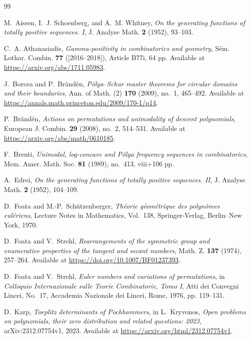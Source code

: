 \documentclass[a4paper,11pt,reqno]{amsart}
\numberwithin{equation}{section}
\theoremstyle{remark}
\begin{document}
\begin{thebibliography}{99}

M.~Aissen, I.~J. Schoenberg, and A.~M. Whitney,
\emph{On the generating functions of totally positive sequences. I},
J. Analyse Math. \textbf{2} (1952), 93--103.

C.~A. Athanasiadis,
\emph{Gamma-positivity in combinatorics and geometry},
S\'em. Lothar. Combin. \textbf{77} ([2016--2018]), Article B77i, 64 pp.
Available at \url{https://arxiv.org/abs/1711.05983}.

J.~Borcea and P.~Br\"and\'en,
\emph{P\'olya--Schur master theorems for circular domains and their boundaries},
Ann. of Math. (2) \textbf{170} (2009), no.~1, 465--492.
Available at \url{https://annals.math.princeton.edu/2009/170-1/p14}.

P.~Br\"and\'en,
\emph{Actions on permutations and unimodality of descent polynomials},
European J. Combin. \textbf{29} (2008), no.~2, 514--531.
Available at \url{https://arxiv.org/abs/math/0610185}.

F.~Brenti,
\emph{Unimodal, log-concave and P\'olya frequency sequences in combinatorics},
Mem. Amer. Math. Soc. \textbf{81} (1989), no.~413, viii+106 pp.

A.~Edrei,
\emph{On the generating functions of totally positive sequences. II},
J. Analyse Math. \textbf{2} (1952), 104--109.

D.~Foata and M.-P.~Sch\"utzenberger,
\emph{Th\'eorie g\'eom\'etrique des polyn\^omes eul\'eriens},
Lecture Notes in Mathematics, Vol.~138, Springer-Verlag, Berlin--New York, 1970.

D.~Foata and V.~Strehl,
\emph{Rearrangements of the symmetric group and enumerative properties of the tangent and secant numbers},
Math. Z. \textbf{137} (1974), 257--264.
Available at \url{https://doi.org/10.1007/BF01237393}.

D.~Foata and V.~Strehl,
\emph{Euler numbers and variations of permutations},
in \emph{Colloquio Internazionale sulle Teorie Combinatorie, Tomo I},
Atti dei Convegni Lincei, No.~17, Accademia Nazionale dei Lincei, Rome, 1976, pp. 119--131.

D.~Karp,
\emph{Toeplitz determinants of Pochhammers},
in L.~Kryvonos,
\emph{Open problems on polynomials, their zero distribution and related questions: 2023},
arXiv:2312.07754v1, 2023.
Available at \url{https://arxiv.org/html/2312.07754v1}.


\end{thebibliography}
\end{document}

